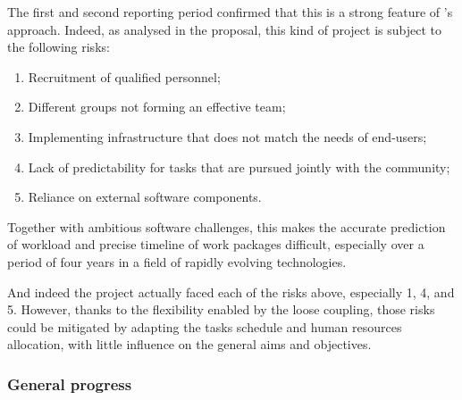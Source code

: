 The first and second reporting period confirmed that this is a strong
feature of \ODK's approach. Indeed, as analysed in the proposal, this
kind of project is subject to the following risks:
\begin{enumerate}
\item Recruitment of qualified personnel;
\item Different groups not forming an effective team;
\item Implementing infrastructure that does not match the needs of end-users;
\item Lack of predictability for tasks that are pursued jointly with
  the community;
\item Reliance on external software components.
\end{enumerate}
Together with ambitious software challenges, this makes the accurate
prediction of workload and precise timeline of work packages
difficult, especially over a period of four years in a field of
rapidly evolving technologies.

And indeed the project actually faced each of the risks above,
especially 1, 4, and 5. However, thanks to the flexibility enabled by
the loose coupling, those risks could be mitigated by adapting the
tasks schedule and human resources allocation, with little influence
on the general aims and objectives.

\subsubsection*{General progress}

